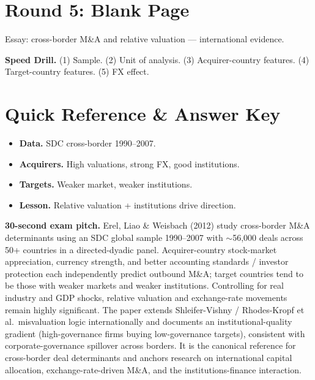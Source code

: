 \documentclass[11pt]{article}
\begin{document}
\section*{Round 5: Blank Page}
Essay: cross-border M\&A and relative valuation --- international evidence.

\vspace{6pt}
\begin{drillbox}
\textbf{Speed Drill.} (1) Sample. (2) Unit of analysis. (3) Acquirer-country features. (4) Target-country features. (5) FX effect.
\end{drillbox}

\section*{Quick Reference \& Answer Key}
\begin{answerbox}
\begin{itemize}
\item \textbf{Data.} SDC cross-border 1990--2007.
\item \textbf{Acquirers.} High valuations, strong FX, good institutions.
\item \textbf{Targets.} Weaker market, weaker institutions.
\item \textbf{Lesson.} Relative valuation + institutions drive direction.
\end{itemize}
\end{answerbox}

\begin{keybox}
\textbf{30-second exam pitch.} Erel, Liao \& Weisbach (2012) study cross-border M\&A determinants using an SDC global sample 1990--2007 with $\sim$56,000 deals across 50+ countries in a directed-dyadic panel. Acquirer-country stock-market appreciation, currency strength, and better accounting standards / investor protection each independently predict outbound M\&A; target countries tend to be those with weaker markets and weaker institutions. Controlling for real industry and GDP shocks, relative valuation and exchange-rate movements remain highly significant. The paper extends Shleifer-Vishny / Rhodes-Kropf et al.\ misvaluation logic internationally and documents an institutional-quality gradient (high-governance firms buying low-governance targets), consistent with corporate-governance spillover across borders. It is the canonical reference for cross-border deal determinants and anchors research on international capital allocation, exchange-rate-driven M\&A, and the institutions-finance interaction.
\end{keybox}
\end{document}
